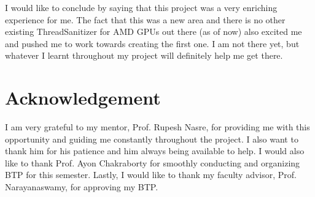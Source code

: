 \documentclass{btp}
\begin{document}
I would like to conclude by saying that this project was a very enriching experience for me. The fact that this was a new area and there is no other existing ThreadSanitizer for AMD GPUs out there (as of now) also excited me and pushed me to work towards creating the first one. I am not there yet, but whatever I learnt throughout my project will definitely help me get there.

\section{Acknowledgement}

I am very grateful to my mentor, Prof. Rupesh Nasre, for providing me with this opportunity and guiding me constantly throughout the project. I also want to thank him for his patience and him always being available to help. I would also like to thank Prof. Ayon Chakraborty for smoothly conducting and organizing BTP for this semester. Lastly, I would like to thank my faculty advisor, Prof. Narayanaswamy, for approving my BTP.



\end{document}
